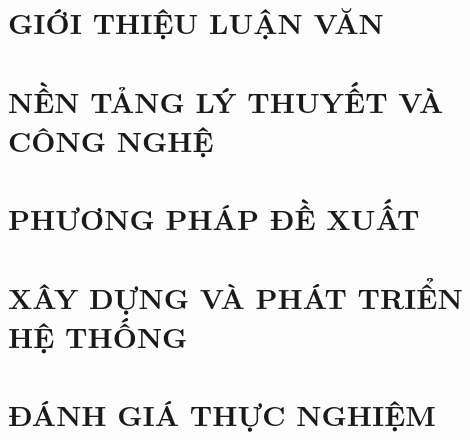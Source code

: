 \documentclass[a4paper,13pt,3p,oneside]{report}
\theoremstyle{definition}
\begin{document}
\renewcommand{\listtablename}{DANH MỤC BẢNG BIỂU}
{\let\oldnumberline\numberline
\renewcommand{\numberline}{Bảng~\oldnumberline}
\listoftables}

\glsaddall 
\renewcommand*{\glossaryname}{Danh sách thuật ngữ}
\renewcommand*{\acronymname}{DANH MỤC THUẬT NGỮ VÀ TỪ VIẾT TẮT}
\renewcommand*{\entryname}{Thuật ngữ}
\renewcommand*{\descriptionname}{Ý nghĩa}
\printnoidxglossary[type=\acronymtype]


% 


\newpage
{}

\pagestyle{fancy}
\fancyhf{}
\fancyhead[L]{\leftmark}
\fancyfoot[R]{\thepage}

\chapter{GIỚI THIỆU LUẬN VĂN}
\label{chapter:Introduction}

\newpage
\chapter{NỀN TẢNG LÝ THUYẾT VÀ CÔNG NGHỆ}
\label{chapter:Methodology}


\newpage
\chapter{PHƯƠNG PHÁP ĐỀ XUẤT}
\label{chapter:ProposedApproach}


\newpage
\chapter{XÂY DỰNG VÀ PHÁT TRIỂN HỆ THỐNG}
\label{chapter:SystemDevelopment}


\newpage
\chapter{ĐÁNH GIÁ THỰC NGHIỆM}
\label{chapter:ExperimentalEvaluation}

\end{document}
